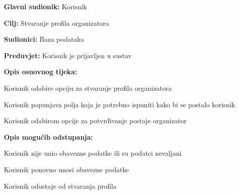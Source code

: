     	\noindent {}
    	\begin{packed_item}
    		
    		\item \textbf{Glavni sudionik: }
    		Korisnik 
    		\item  \textbf{Cilj:} Stvaranje profila organizatora
    		\item  \textbf{Sudionici:} Baza podataka
    		\item  \textbf{Preduvjet:} Korisnik je prijavljen u sustav
    		\item  \textbf{Opis osnovnog tijeka:}
    		
    		\item[] \begin{packed_enum}
    			
    			\item Korisnik odabire opciju za stvaranje profila organizatora
    			\item Korisnik popunjava polja koja je potrebno ispuniti kako bi se postalo korisnik 
    			\item Korisnik odabirom opcije za potvrđivanje postaje organizator
    			
    		\end{packed_enum}
    		
    		\item  \textbf{Opis mogućih odstupanja:}
    		
    		\item[] \begin{packed_item}
    			
    			\item[3.a] Korisnik nije unio obavezne podatke ili su podatci nevaljani
    			\item[] \begin{packed_enum}
    				
    				\item Korisnik ponovno unosi obavezne podatke
    				\item Korisnik odustaje od stvaranja profila
    				
    			\end{packed_enum}
    			
    		\end{packed_item}
    	\end{packed_item}
    
